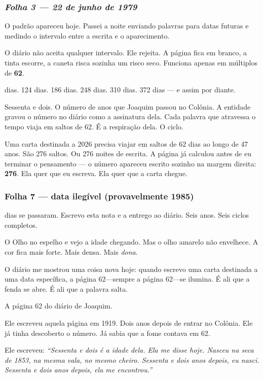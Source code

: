 \subsubsection*{\textit{Folha 3 --- 22 de junho de 1979}}

\noindent O padrão apareceu hoje. Passei a noite enviando palavras para datas futuras e medindo o intervalo entre a escrita e o aparecimento.

\noindent O diário não aceita qualquer intervalo. Ele rejeita. A página fica em branco, a tinta escorre, a caneta risca sozinha um risco seco. Funciona apenas em múltiplos de \textbf{62}.

 dias. 124 dias. 186 dias. 248 dias. 310 dias. 372 dias --- e assim por diante.

\noindent Sessenta e dois. O número de anos que Joaquim passou no Colônia. A entidade gravou o número no diário como a assinatura dela. Cada palavra que atravessa o tempo viaja em saltos de 62. É a respiração dela. O ciclo.

\noindent Uma carta destinada a 2026 precisa viajar em saltos de 62 dias ao longo de 47 anos. São 276 saltos. Ou 276 noites de escrita. A página já calculou antes de eu terminar o pensamento --- o número apareceu escrito sozinho na margem direita: \textbf{276}. Ela quer que eu escreva. Ela quer que a carta chegue.

\subsubsection*{Folha 7 --- data ilegível (provavelmente 1985)}

 dias se passaram. Escrevo esta nota e a entrego ao diário. Seis anos. Seis ciclos completos.

\noindent O Olho no espelho e vejo a idade chegando. Mas o olho amarelo não envelhece. A cor fica mais forte. Mais densa. Mais \textit{dona}.

\noindent O diário me mostrou uma coisa nova hoje: quando escrevo uma carta destinada a uma data específica, a página 62---sempre a página 62---se ilumina. É ali que a fenda se abre. É ali que a palavra salta.

\noindent A página 62 do diário de Joaquim.

\noindent Ele escreveu aquela página em 1919. Dois anos depois de entrar no Colônia. Ele já tinha descoberto o número. Já sabia que a fome contava em 62.

\noindent Ele escreveu: \textit{\textquotedblleft{}Sessenta e dois é a idade dela. Ela me disse hoje. Nasceu na seca de 1853, na mesma vala, no mesmo cheiro. Sessenta e dois anos depois, eu nasci. Sessenta e dois anos depois, ela me encontrou.\textquotedblright{}}

